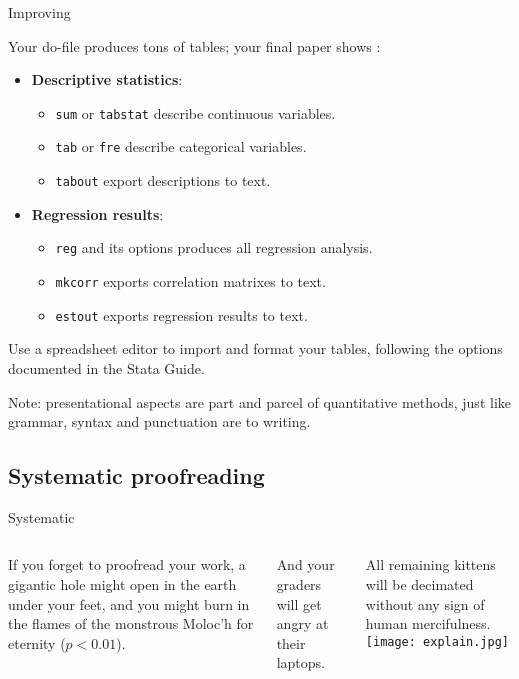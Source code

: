 \documentclass[t]{beamer}
\begin{document}
	\begin{frame}[t]{Improving }

		Your do-file produces tons of tables; your final paper shows :
		
		\begin{itemize}
			
			\item \textbf{Descriptive statistics}: \\

			\begin{itemize}
				\item \texttt{sum} or \texttt{tabstat} describe continuous variables.
				\item \texttt{tab} or \texttt{fre} describe categorical variables.
				
				\item \texttt{tabout} export descriptions to text.
			\end{itemize}
			
			\item \textbf{Regression results}: \\
						
			\begin{itemize}
				\item \texttt{reg} and its options produces all regression analysis.
				\item \texttt{mkcorr} exports correlation matrixes to text.
				\item \texttt{estout} exports regression results to text.
			\end{itemize}
		
		\end{itemize}

			Use a spreadsheet editor to import and format your tables, following the options documented in the Stata Guide.\vspace{1em}
			
			Note: presentational aspects are part and parcel of quantitative methods, just like grammar, syntax and punctuation are to writing.
	\end{frame}
	
	\subsection{Systematic proofreading}

	\begin{frame}[t]{Systematic }
		\begin{columns}[T]
			If you forget to proofread your work, a gigantic hole might open in the earth under your feet, and you might burn in the flames of the monstrous Moloc'h for eternity ($p < 0.01$).\vspace{1em}
			
			And your graders will get angry at their laptops.\vspace{1em}
			
			All remaining kittens will be decimated without any sign of human mercifulness.
			\texttt{[image: explain.jpg]}
		\end{columns}
	\end{frame}
\end{document}
